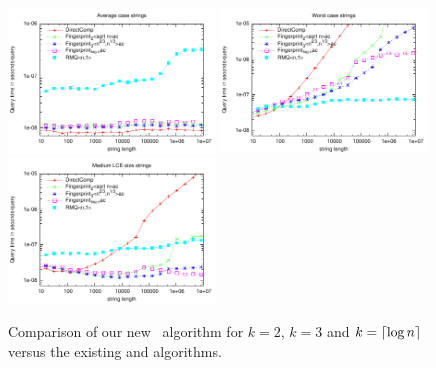 \documentclass[a4]{article}
\begin{document}
\begin{figure}[tp]
    \begin{center}
        \includegraphics[width=0.49\textwidth,type=pdf,ext=.pdf,read=.pdf]{../src/results/length-article-rand10.plt}
        \includegraphics[width=0.49\textwidth,type=pdf,ext=.pdf,read=.pdf]{../src/results/length-article-alla.plt}
        \includegraphics[width=0.49\textwidth,type=pdf,ext=.pdf,read=.pdf]{../src/results/length-article-repeat-pow.plt}
    \end{center}
    \caption{\label{fig:test-fingerprint}Comparison of our new \fprintk\ algorithm for $k=2$, $k=3$ and $k=\lceil\log n\rceil$ versus the existing  and  algorithms.}
\end{figure}
\end{document}
